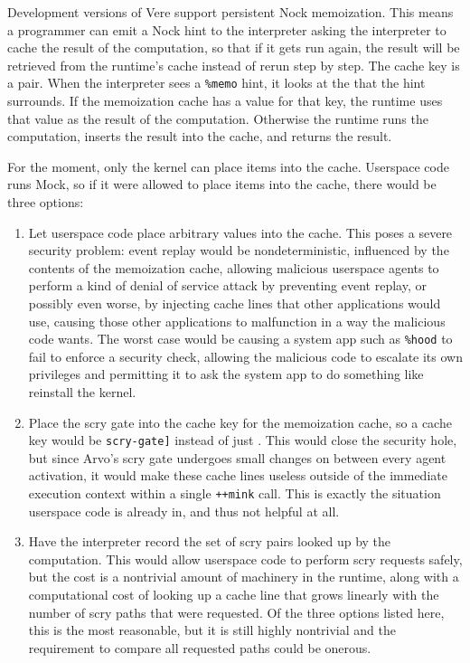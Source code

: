 \documentclass[twoside]{article}
\begin{document}
Development versions of Vere support persistent Nock memoization.  This means a programmer can emit a Nock hint to the interpreter asking the interpreter to cache the result of the computation, so that if it gets run again, the result will be retrieved from the runtime's cache instead of rerun step by step.  The cache key is a \texttt{} pair.  When the interpreter sees a \texttt{\%memo} hint, it looks at the \texttt{} that the hint surrounds. If the memoization cache has a value for that key, the runtime uses that value as the result of the computation.  Otherwise the runtime runs the computation, inserts the result into the cache, and returns the result.

For the moment, only the kernel can place items into the cache.  Userspace code runs Mock, so if it were allowed to place items into the cache, there would be three options:

\begin{enumerate}
  \item  Let userspace code place arbitrary values into the cache.  This poses a severe security problem:  event replay would be nondeterministic, influenced by the contents of the memoization cache, allowing malicious userspace agents to perform a kind of denial of service attack by preventing event replay, or possibly even worse, by injecting cache lines that other applications would use, causing those other applications to malfunction in a way the malicious code wants.  The worst case would be causing a system app such as \texttt{\%hood} to fail to enforce a security check, allowing the malicious code to escalate its own privileges and permitting it to ask the system app to do something like reinstall the kernel.

  \item  Place the scry gate into the cache key for the memoization cache, so a cache key would be \texttt{\string[\string[subject formula\string] scry-gate\string]} instead of just \texttt{}.  This would close the security hole, but since Arvo's scry gate undergoes small changes on between every agent activation, it would make these cache lines useless outside of the immediate execution context within a single \texttt{++mink} call.  This is exactly the situation userspace code is already in, and thus not helpful at all.

  \item  Have the interpreter record the set of scry \texttt{} pairs looked up by the computation.  This would allow userspace code to perform scry requests safely, but the cost is a nontrivial amount of machinery in the runtime, along with a computational cost of looking up a cache line that grows linearly with the number of scry paths that were requested.  Of the three options listed here, this is the most reasonable, but it is still highly nontrivial and the requirement to compare all requested paths could be onerous.
\end{enumerate}
\end{document}
